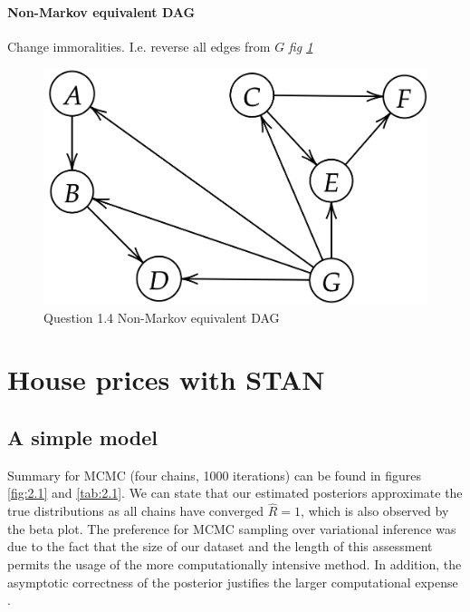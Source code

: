 \documentclass[11pt,a4paper]{article}
\begin{document}
\paragraph{Non-Markov equivalent DAG}
Change immoralities. I.e. reverse all edges from \(G\) \textit{fig \ref{fig:1.4}}
\begin{figure}[htb]
  \centering
    \includegraphics[width=\textwidth]{../q1/fig14.png}
    \caption{Question 1.4 Non-Markov equivalent DAG}
  \label{fig:1.4}
\end{figure}

\section{House prices with STAN}

  \subsection{A simple model}
  Summary for MCMC (four chains, 1000 iterations) can be found in figures \ref{fig:2.1} and \ref{tab:2.1}.
  We can state that our estimated posteriors approximate the true distributions as all chains have converged \(\hat{R} = 1\), which is also observed by the beta plot. The preference for MCMC sampling over variational inference was due to the fact that the size of our dataset and the length of this assessment permits the usage of the more computationally intensive method. In addition, the asymptotic correctness of the posterior justifies the larger computational expense \parencite{BleiVI}.
\end{document}

